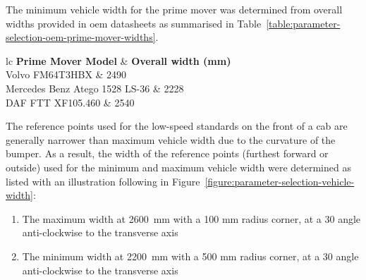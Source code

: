 The minimum vehicle width for the prime mover was determined from overall widths provided in \gls{oem} datasheets as summarised in Table~\ref{table:parameter-selection-oem-prime-mover-widths}.

\begin{table}[H]
	\centering\footnotesize
	\begin{threeparttable}

		\begin{tabulary}{\textwidth}{lc}
			\toprule
			\textbf{Prime Mover Model} & \textbf{Overall width (mm)} \\
			\midrule
			Volvo FM64T3HBX \cite{VolvoTruckCorporation2018FM64T3HBX} & 2490 \\
			Mercedes Benz Atego 1528 LS-36 \cite{MercedesBenzAtego2015} & 2228 \\
			DAF FTT XF105.460 \cite{DAFXF105.4602017} & 2540 \\
			\bottomrule
		\end{tabulary}

		\caption{Selection of \gls{oem} prime mover widths}
		\label{table:parameter-selection-oem-prime-mover-widths}


	\end{threeparttable}
\end{table}

The reference points used for the low-speed standards on the front of a cab are generally narrower than maximum vehicle width due to the curvature of the bumper. As a result, the width of the reference points (furthest forward or outside) used for the minimum and maximum vehicle width were determined as listed with an illustration following in Figure~\ref{figure:parameter-selection-vehicle-width}:

\begin{enumerate}
	\item The maximum width at 2600~mm with a 100 mm radius corner, at a 30\degree{} angle anti-clockwise to the transverse axis
	\item The minimum width at 2200~mm with a 500 mm radius corner, at a 30\degree{} angle anti-clockwise to the transverse axis
\end{enumerate}

